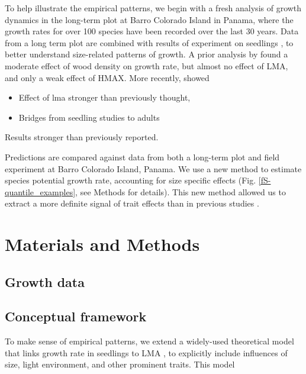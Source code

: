 \documentclass[12pt, a4paper]{article}
\begin{document}
To help illustrate the empirical patterns, we begin with a fresh analysis of
growth dynamics in the long-term plot at Barro Colorado Island in Panama,
where the growth rates for over 100 species have been recorded over the last
30 years. Data from a long term plot \citep{condit-2012} are combined
with results of experiment on seedlings \citep{kitajima-2013}, to better understand
size-related patterns of growth. A prior analysis by
 \citet{wright-2010} found a moderate effect of wood density on
growth rate, but almost no effect of LMA, and only a weak effect of HMAX. More recently,
 \citet{ruger-2012} showed

\begin{itemize}
\itemsep1pt\parskip0pt
\item
  Effect of lma stronger than previously thought,
\item
  Bridges from seedling studies to adults
\end{itemize}

Results stronger than previously reported.

Predictions
are compared against data from both a long-term
plot \citep{condit-2012} and field
experiment \citep{kitajima-2013} at Barro Colorado Island, Panama.
We use a new method to estimate species potential growth rate,
accounting for size specific effects (Fig. \ref{fS-quantile_examples},
see Methods for details). This new method allowed us to extract a more
definite signal of trait effects than in previous
studies \citep{wright-2010}.

\section{Materials and Methods}\label{materials-and-methods}

\subsection{Growth data}\label{growth-data}


\subsection{Conceptual framework}\label{conceptual-framework}

To make sense of empirical patterns, we extend a widely-used theoretical model that links growth rate in
seedlings to LMA \citep{lambers-1992, wright_cross-2000}, to explicitly include influences of
size, light environment, and other prominent traits. This model
\end{document}
